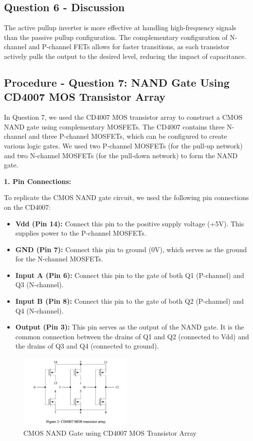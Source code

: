 \documentclass{article}
\begin{document}
    \subsection*{\textbf{Question 6 - Discussion}}
    The active pullup inverter is more effective at handling high-frequency signals than the passive pullup configuration. The complementary configuration of N-channel and P-channel FETs allows for faster transitions, as each transistor actively pulls the output to the desired level, reducing the impact of capacitance.

    \subsection*{\textbf{Procedure - Question 7: NAND Gate Using CD4007 MOS Transistor Array}}
    In Question 7, we used the CD4007 MOS transistor array to construct a CMOS NAND gate using complementary MOSFETs. The CD4007 contains three N-channel and three P-channel MOSFETs, which can be configured to create various logic gates. We used two P-channel MOSFETs (for the pull-up network) and two N-channel MOSFETs (for the pull-down network) to form the NAND gate.
    
    \textbf{1. Pin Connections:}
    
    To replicate the CMOS NAND gate circuit, we used the following pin connections on the CD4007:
    
    \begin{itemize}
        \item \textbf{Vdd (Pin 14):} Connect this pin to the positive supply voltage (+5V). This supplies power to the P-channel MOSFETs.
        \item \textbf{GND (Pin 7):} Connect this pin to ground (0V), which serves as the ground for the N-channel MOSFETs.
        \item \textbf{Input A (Pin 6):} Connect this pin to the gate of both Q1 (P-channel) and Q3 (N-channel).
        \item \textbf{Input B (Pin 8):} Connect this pin to the gate of both Q2 (P-channel) and Q4 (N-channel).
        \item \textbf{Output (Pin 3):} This pin serves as the output of the NAND gate. It is the common connection between the drains of Q1 and Q2 (connected to Vdd) and the drains of Q3 and Q4 (connected to ground).
    \end{itemize}
    
    \begin{figure}[H]
        \centering
        \includegraphics[width=0.5\textwidth]{./img/Lab 10/10_7_1.png} 
        \caption{CMOS NAND Gate using CD4007 MOS Transistor Array}
        \label{fig:CMOS_NAND_Gate}
    \end{figure}
    
\end{document}
